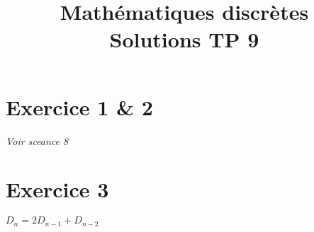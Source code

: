 \documentclass[fontsize=10pt]{article}
\title{\textbf{Mathématiques discrètes}\\ Solutions TP 9}
\date{}
\newcommand\tab[1][1cm]{\hspace*{#1}}
\begin{document}
\maketitle %

\section*{Exercice 1 \& 2}

\textit{Voir sceance 8}\\

\section*{Exercice 3}
\tab $D_{n} = 2D_{n-1}+D_{n-2}$\\
 
\end{document}
